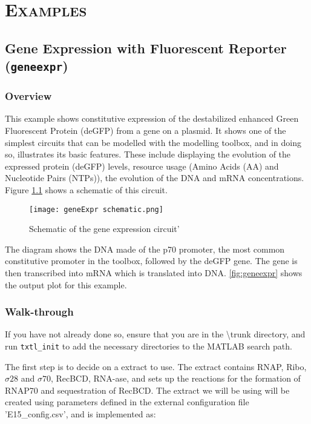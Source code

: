 \chapter{\textsc{Examples}}
	\section{Gene Expression with Fluorescent Reporter (\texttt{geneexpr})}
		\subsection{Overview}
		This example shows constitutive expression of the destabilized enhanced Green Fluorescent Protein (deGFP) from a gene on a plasmid. It shows one of the simplest circuits that can be modelled with the modelling toolbox, and in doing so, illustrates its basic features. These include displaying the evolution of the expressed protein (deGFP) levels, resource usage (Amino Acids (AA) and Nucleotide Pairs (NTPs)), the evolution of the DNA and mRNA concentrations. Figure \ref{fig:geneexpr schematic} shows a schematic of this circuit. \\
		
		\begin{figure}
		\begin{center}
		\texttt{[image: geneExpr schematic.png]} 
		\caption{Schematic of the gene expression circuit'}
		\label{fig:geneexpr schematic}
		\end{center}
		\end{figure}		
		 
		The diagram shows the DNA made of the p70 promoter, the most common constitutive promoter in the toolbox, followed by the deGFP gene. The gene is then transcribed into mRNA which is translated into DNA. 
		\ref{fig:geneexpr} shows the output plot for this example. 
		
		
		
		\subsection{Walk-through}
		If you have not already done so, ensure that you are in the \textsf{\textbackslash trunk} directory, and run \texttt{txtl\_init} to add the necessary directories to the MATLAB search path. 
			
		The first step is to decide on a extract to use. The extract contains RNAP, Ribo, $\sigma 28$ and $\sigma 70$, RecBCD, RNA-ase, and sets up the reactions for the formation of RNAP70 and sequestration of RecBCD. The extract we will be using will be created using parameters defined in the external configuration file \textsf{'E15\_config.csv'}, and is implemented as: 
		
